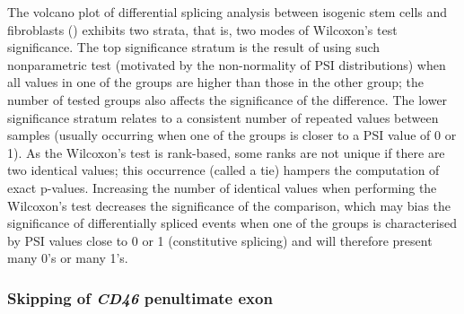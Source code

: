 The volcano plot of differential splicing analysis between isogenic stem cells and fibroblasts () exhibits two strata, that is, two modes of Wilcoxon’s test significance. The top significance stratum is the result of using such nonparametric test (motivated by the non-normality of PSI distributions) when all values in one of the groups are higher than those in the other group; the number of tested groups also affects the significance of the difference. The lower significance stratum relates to a consistent number of repeated values between samples (usually occurring when one of the groups is closer to a PSI value of 0 or 1). As the Wilcoxon’s test is rank-based, some ranks are not unique if there are two identical values; this occurrence (called a tie) hampers the computation of exact p-values. Increasing the number of identical values when performing the Wilcoxon’s test decreases the significance of the comparison, which may bias the significance of differentially spliced events when one of the groups is characterised by PSI values close to 0 or 1 (constitutive splicing) and will therefore present many 0's or many 1's.

\subsubsection{Skipping of \emph{CD46} penultimate exon}

